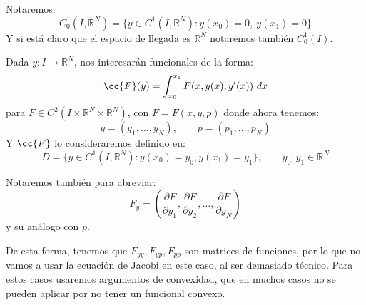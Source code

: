 \begin{notacion}
    Notaremos:
    \begin{equation*}
        C_0^1(I,\mathbb{R}^N) = \{y\in C^1(I,\mathbb{R}^N): y(x_0) = 0,\ y(x_1) = 0\}
    \end{equation*}
    Y si está claro que el espacio de llegada es $\mathbb{R}^N$ notaremos también $C^1_0(I)$.
\end{notacion}

\noindent
Dada $y:I\to \mathbb{R}^N$, nos interesarán funcionales de la forma:
\begin{equation*}
    \cc{F}(y) = \int_{x_0}^{x_1} F(x,y(x),y'(x))~dx 
\end{equation*}
para $F\in C^2(I\times\mathbb{R}^N\times\mathbb{R}^N)$, con $F=F(x,y,p)$ donde ahora tenemos:
\begin{equation*}
    y = (y_1,\ldots,y_N), \qquad p = (p_1,\ldots,p_N)
\end{equation*}
Y $\cc{F}$ lo consideraremos definido en:
\begin{equation*}
    D = \{y\in C^1(I,\mathbb{R}^N) : y(x_0) = y_0, y(x_1) = y_1\}, \qquad y_0,y_1\in \mathbb{R}^N
\end{equation*}

\begin{notacion}
    Notaremos también para abreviar:
    \begin{equation*}
        F_y = \left(\frac{\partial F}{\partial y_1},\frac{\partial F}{\partial y_2},\ldots,\frac{\partial F}{\partial y_N}\right)
    \end{equation*}
    y su análogo con $p$. 
\end{notacion}

\noindent
De esta forma, tenemos que $F_{yy}, F_{yp}, F_{pp}$ son matrices de funciones, por lo que no vamos a usar la ecuación de Jacobi en este caso, al ser demasiado técnico. Para estos casos usaremos argumentos de convexidad, que en muchos casos no se pueden aplicar por no tener un funcional convexo.\\

